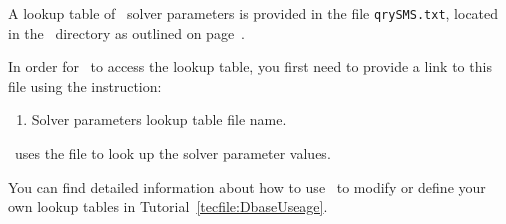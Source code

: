 \label{section:SolverParameters}
A lookup table of \mfus\ solver parameters is provided in the file \texttt{qrySMS.txt}, located in the \bin\ directory as outlined on page~\pageref{page:userbin}.

In order for \mut\ to access the lookup table, you first need to provide a link to this file using the instruction:

    {
        \squish
        \begin{enumerate}
        \item {}  Solver parameters lookup table file name.
        \end{enumerate}
          \mut\ uses the file  to look up the solver parameter values.
    }


You can find detailed information about how to use \dbase\ to modify or define your own lookup tables in Tutorial~\ref{tecfile:DbaseUseage}.
